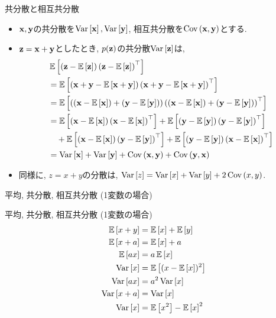 \documentclass[dvipdfmx,notheorems,t]{beamer}
\begin{document}
\begin{frame}{共分散と相互共分散}
\begin{itemize}
  \item $\vb{x}, \vb{y}$の共分散を$\Var{\vb{x}}, \Var{\vb{y}}$, 相互共分散を$\Cov{\vb{x}}{\vb{y}}$とする.
  \item $\vb{z} = \vb{x} + \vb{y}$としたとき, $p(\vb{z})$の共分散$\Var{\vb{z}}$は,
  {\small \begin{align*}
    & \E{\left( \vb{z} - \E{\vb{z}} \right) \left( \vb{z} - \E{\vb{z}} \right)^\top} \\
    &= \E{\left( \vb{x} + \vb{y} - \E{\vb{x} + \vb{y}} \right)
      \left( \vb{x} + \vb{y} - \E{\vb{x} + \vb{y}} \right)^\top} \\
    &= \E{\left( \left( \vb{x} - \E{\vb{x}} \right) + \left( \vb{y} - \E{\vb{y}} \right) \right)
      \left( \left( \vb{x} - \E{\vb{x}} \right) + \left( \vb{y} - \E{\vb{y}} \right) \right)^\top} \\
    &= \E{\left( \vb{x} - \E{\vb{x}} \right) \left( \vb{x} - \E{\vb{x}} \right)^\top}
      + \E{\left( \vb{y} - \E{\vb{y}} \right) \left( \vb{y} - \E{\vb{y}} \right)^\top} \\
    & \quad + \E{\left( \vb{x} - \E{\vb{x}} \right) \left( \vb{y} - \E{\vb{y}} \right)^\top}
      + \E{\left( \vb{y} - \E{\vb{y}} \right) \left( \vb{x} - \E{\vb{x}} \right)^\top} \\
    &= \Var{\vb{x}} + \Var{\vb{y}} + \Cov{\vb{x}}{\vb{y}} + \Cov{\vb{y}}{\vb{x}}
  \end{align*}}
  \item 同様に, $z = x + y$の分散は, $\Var{z} = \Var{x} + \Var{y} + 2 \Cov{x}{y}$.
\end{itemize}
\end{frame}

\begin{frame}{平均, 共分散, 相互共分散 (1変数の場合)}
\begin{block}{平均, 共分散, 相互共分散 (1変数の場合)}
  \begin{align*}
    \E{x + y} &= \E{x} + \E{y} \\
    \E{x + a} &= \E{x} + a \\
    \E{ax} &= a \E{x} \\
    \Var{x} &= \E{(x - \E{x})^2} \\
    \Var{ax} &= a^2 \Var{x} \\
    \Var{x + a} &= \Var{x} \\
    \Var{x} &= \E{x^2} - \E{x}^2
  \end{align*}
\end{block}
\end{frame}
\end{document}
